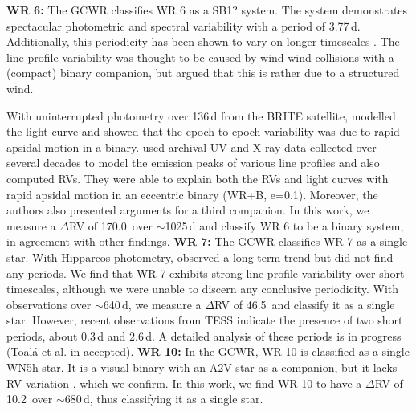 \newline 
\newline
\textbf{WR 6:} The GCWR classifies WR 6 as a SB1? system. The system demonstrates spectacular photometric \citep[][and references therein]{1998MarchenkoMoffatPhotometry} and spectral \citep[]{1997Morel,2007Flores} variability with a period of 3.77\,d. Additionally, this periodicity has been shown to vary on longer timescales \citep[][]{1989DrissenWR6,1992RobertWR6}. The line-profile variability was thought to be caused by wind-wind collisions with a (compact) binary companion, but \citet{1997Morel} argued that this is rather due to a structured wind. 

With uninterrupted photometry over 136\,d from the BRITE satellite, \citet{2019SchmutzKoenigsbergerWR6} modelled the light curve and showed that the epoch-to-epoch variability was due to rapid apsidal motion in a binary. \citet{2020Koenigsberger} used archival UV and X-ray data collected over several decades to model the emission peaks of various line profiles and also computed RVs. They were able to explain both the RVs and light curves with rapid apsidal motion in an eccentric binary (WR+B, e=0.1). Moreover, the authors also presented arguments for a third companion. In this work, we measure a $\Delta$RV of 170.0\,\kms{} over ${\sim}$1025\,d and classify WR 6 to be a binary system, in agreement with other findings. 
\newline
\newline
\textbf{WR 7:} The GCWR classifies WR 7 as a single star. With Hipparcos photometry, \citet{1998MarchenkoMoffatPhotometry} observed a long-term trend but did not find any periods. We find that WR 7 exhibits strong line-profile variability over short timescales, although we were unable to discern any conclusive periodicity. With observations over ${\sim}$640\,d, we measure a $\Delta$RV of 46.5\,\kms{} and classify it as a single star. However, recent observations from TESS indicate the presence of two short periods, about 0.3\,d and 2.6\,d. A detailed analysis of these periods is in progress (Toal\'{a} et al. in accepted).
\newline
\newline
\textbf{WR 10:} In the GCWR, WR 10 is classified as a single WN5h star. It is a visual binary with an A2V star as a companion, but it lacks RV variation \citep[][]{1999aNiemela}, which we confirm. In this work, we find WR 10 to have a $\Delta$RV of 10.2\,\kms{} over ${\sim}$680\,d, thus classifying it as a single star. 
\newline
